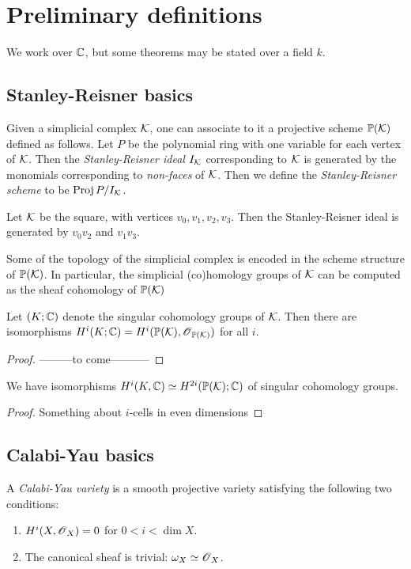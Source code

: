 \chapter{Preliminary definitions}

We work over $\mathbb{C}$, but some theorems may be stated over a field $k$.

\section{Stanley-Reisner basics} 

Given a simplicial complex $\mathcal K$, one can associate to it a projective scheme $\mathbb{P}(\mathcal K)$ defined as follows. Let $P$ be the polynomial ring with one variable for each vertex of $\mathcal K$. Then the \emph{Stanley-Reisner ideal $I_\mathcal K$} corresponding to $\mathcal K$ is generated by the monomials corresponding to \emph{non-faces} of $\mathcal K$. Then we define the \emph{Stanley-Reisner scheme} to be $\operatorname{Proj} P/I_\mathcal K$. 

\begin{example}
Let $\mathcal K$ be the square, with vertices $v_0,v_1,v_2,v_3$. Then the Stanley-Reisner ideal is generated by $v_0v_2$ and $v_1v_3$.
\end{example}

Some of the topology of the simplicial complex is encoded in the scheme structure of $\mathbb{P}(\mathcal K)$. In particular, the simplicial (co)homology groups of $\mathcal K$ can be computed as the sheaf cohomology of $\mathbb{P}(\mathcal K)$

\begin{lemma}
Let $(K;\mathbb{C})$ denote the singular cohomology groups of $\mathcal K$. Then there are isomorphisms $H^i(K;\mathbb{C})=H^i(\mathbb{P}(\mathcal K),\operatorname{\mathscr{O}}_{\mathbb{P}(\mathcal K)})$ for all $i$.
\end{lemma}
\begin{proof}
---------to come-----------
\end{proof}

\begin{corr}
We have isomorphisms $H^i(K,\mathbb{C}) \simeq H^{2i}(\mathbb{P}(\mathcal K);\mathbb{C})$ of singular cohomology groups.
\end{corr}
\begin{proof}
Something about $i$-cells in even dimensions
\end{proof}

\section{Calabi-Yau basics}

\begin{defi}
A \emph{Calabi-Yau variety} is a smooth projective variety satisfying the following two conditions:
\begin{enumerate}
	\item $H^i(X,\operatorname{\mathscr{O}}_X)=0$ for $0 < i < \dim X$.
	\item The canonical sheaf is trivial: $\omega_X \simeq \operatorname{\mathscr{O}}_X$. 
\end{enumerate}
\end{defi}

